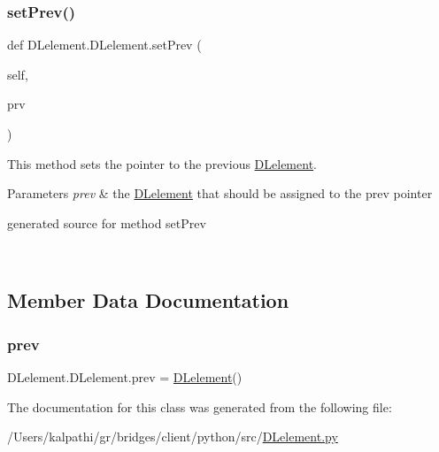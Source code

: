 \subsubsection{\texorpdfstring{set\+Prev()}{setPrev()}}
{\footnotesize\ttfamily def D\+Lelement.\+D\+Lelement.\+set\+Prev (\begin{DoxyParamCaption}\item[{}]{self,  }\item[{}]{prv }\end{DoxyParamCaption})}



This method sets the pointer to the previous \hyperlink{class_d_lelement_1_1_d_lelement}{D\+Lelement}. 


\begin{DoxyParams}{Parameters}
{\em prev} & the \hyperlink{class_d_lelement_1_1_d_lelement}{D\+Lelement} that should be assigned to the prev pointer\begin{DoxyVerb}generated source for method setPrev \end{DoxyVerb}
 \\
\hline
\end{DoxyParams}


\subsection{Member Data Documentation}
\hypertarget{class_d_lelement_1_1_d_lelement_a14bf836d9e64de3f407da9bb7ba93622}{}\label{class_d_lelement_1_1_d_lelement_a14bf836d9e64de3f407da9bb7ba93622} 
\subsubsection{\texorpdfstring{prev}{prev}}
{\footnotesize\ttfamily D\+Lelement.\+D\+Lelement.\+prev = \hyperlink{class_d_lelement_1_1_d_lelement}{D\+Lelement}()\hspace{0.3cm}{\ttfamily [static]}}



The documentation for this class was generated from the following file\+:\begin{DoxyCompactItemize}
\item 
/\+Users/kalpathi/gr/bridges/client/python/src/\hyperlink{_d_lelement_8py}{D\+Lelement.\+py}\end{DoxyCompactItemize}
